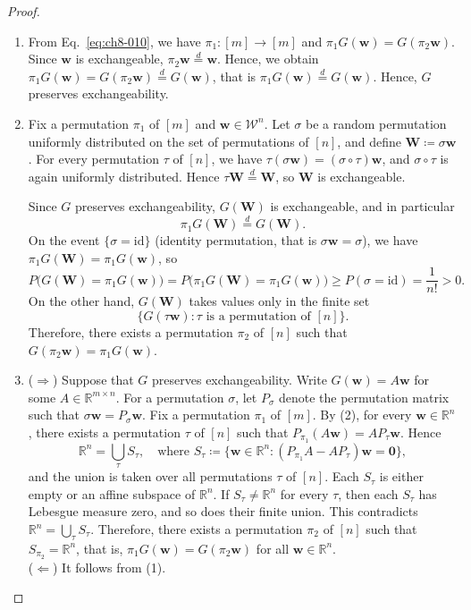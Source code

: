 \documentclass[a4paper,12pt]{article}
\numberwithin{equation}{section}
\theoremstyle{plain}
\theoremstyle{definition}
\theoremstyle{remark}
\begin{document}
\begin{proof}
    \begin{enumerate}
        \item From Eq.~\eqref{eq:ch8-010}, we have $\pi_1:[m]\to[m]$ and $\pi_1G(\bm{w})=G(\pi_2\bm{w})$. Since $\bm{w}$ is exchangeable, $\pi_2\bm{w}\overset{d}{=}\bm{w}$. Hence, we obtain $\pi_1G(\bm{w})=G(\pi_2\bm{w})\overset{d}{=}G(\bm{w})$, that is $\pi_1G(\bm{w})\overset{d}{=}G(\bm{w})$. Hence, $G$ preserves exchangeability.
        \item Fix a permutation $\pi_1$ of $[m]$ and $\bm{w}\in\mathcal{W}^n$. Let $\sigma$ be a random permutation uniformly distributed on the set of permutations of $[n]$, and define $\bm{W}\coloneqq\sigma\bm{w}$. For every permutation $\tau$ of $[n]$, we have $\tau(\sigma\bm{w})=(\sigma\circ\tau)\bm{w}$, and $\sigma\circ\tau$ is again uniformly distributed. Hence $\tau\bm{W}\overset{d}{=}\bm{W}$, so $\bm{W}$ is exchangeable.

        Since $G$ preserves exchangeability, $G(\bm{W})$ is exchangeable, and in particular
        \[
            \pi_1G(\bm{W})\overset{d}{=}G(\bm{W}).
        \]
        On the event $\{\sigma=\mathrm{id}\}$ (identity permutation, that is $\sigma\bm{w}=\sigma$), we have $\pi_1G(\bm{W})=\pi_1G(\bm{w})$, so
        \[
            P\bigl(G(\bm{W})=\pi_1G(\bm{w})\bigr)
            =P\bigl(\pi_1G(\bm{W})=\pi_1G(\bm{w})\bigr)
            \geq P(\sigma=\mathrm{id})=\frac{1}{n!}>0.
        \]
        On the other hand, $G(\bm{W})$ takes values only in the finite set
        \[
            \{G(\tau\bm{w}):\tau \text{ is a permutation of } [n]\}.
        \]
        Therefore, there exists a permutation $\pi_2$ of $[n]$ such that $G(\pi_2\bm{w})=\pi_1G(\bm{w})$.
        \item ($\Rightarrow$) Suppose that $G$ preserves exchangeability. Write $G(\bm{w})=A\bm{w}$ for some $A\in\mathbb{R}^{m\times n}$. For a permutation $\sigma$, let $P_\sigma$ denote the permutation matrix such that $\sigma\bm{w}=P_\sigma\bm{w}$. Fix a permutation $\pi_1$ of $[m]$. By (2), for every $\bm{w}\in\mathbb{R}^n$, there exists a permutation $\tau$ of $[n]$ such that $P_{\pi_1}(A\bm{w})=AP_\tau\bm{w}$. Hence
        \[
            \mathbb{R}^n=\bigcup_{\tau}S_\tau,
            \quad\text{where } S_\tau\coloneqq\{\bm{w}\in\mathbb{R}^n:(P_{\pi_1}A-AP_\tau)\bm{w}=\bm{0}\},
        \]
        and the union is taken over all permutations $\tau$ of $[n]$. Each $S_\tau$ is either empty or an affine subspace of $\mathbb{R}^n$. If $S_\tau\neq\mathbb{R}^n$ for every $\tau$, then each $S_\tau$ has Lebesgue measure zero, and so does their finite union. This contradicts $\mathbb{R}^n=\bigcup_\tau S_\tau$. Therefore, there exists a permutation $\pi_2$ of $[n]$ such that $S_{\pi_2}=\mathbb{R}^n$, that is, $\pi_1G(\bm{w})=G(\pi_2\bm{w})$ for all $\bm{w}\in\mathbb{R}^n$.\\
        ($\Leftarrow$) It follows from (1).\qedhere
    \end{enumerate}
\end{proof}
\end{document}
